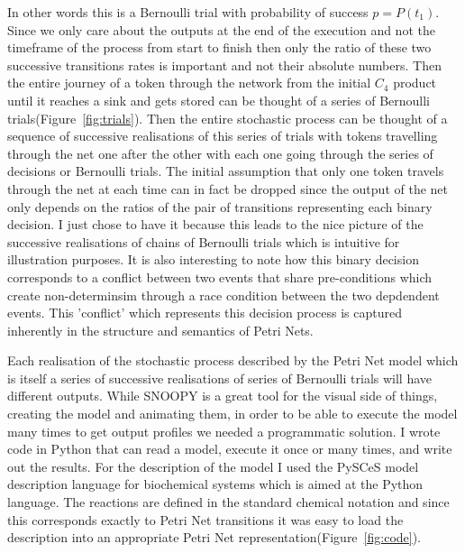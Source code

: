 In other words this is a Bernoulli trial with probability of success
$p = P(t_1)$. Since we only care about the outputs at the end of the
execution and not the timeframe of the process from start to finish
then only the ratio of these two successive transitions rates is
important and not their absolute numbers. Then the entire journey of a token through the network
from the initial $C_4$ product until it reaches a sink and gets stored
can be thought of a series of Bernoulli
trials(Figure~\ref{fig:trials}). Then the entire stochastic process
can be thought of a sequence of successive realisations of this series
of trials with tokens travelling through the net one
after the other with each one going through the series of decisions
or Bernoulli trials. The initial assumption that only one token
travels through the net at each time can in fact be dropped since the
output of the net only depends on the ratios of the pair of
transitions representing each binary decision. I just chose to have it
because this leads to the nice picture of the successive realisations
of chains of Bernoulli trials which is intuitive for illustration
purposes.
It is also interesting to note how this binary decision
corresponds to a conflict between two events that share pre-conditions
which create non-determinsim through a race condition between the two
depdendent events. This 'conflict' which represents this decision
process is captured inherently in the structure and semantics of Petri
Nets.

Each realisation of the stochastic process described by the Petri Net
model which is itself a series of successive realisations of series of
Bernoulli trials will have different outputs. While SNOOPY is a great
tool for the visual side of things, creating the model and animating
them, in order to be able to execute the model many times to get
output profiles we needed a programmatic solution. I wrote code in
Python that can read a model, execute it once or many times, and write
out the results. For the description of the model I used the PySCeS
model description language for biochemical systems which is aimed at
the Python language. The reactions are
defined in the standard chemical notation and since this corresponds
exactly to Petri Net transitions it was easy to load the description
into an appropriate Petri Net representation(Figure~\ref{fig:code}).


